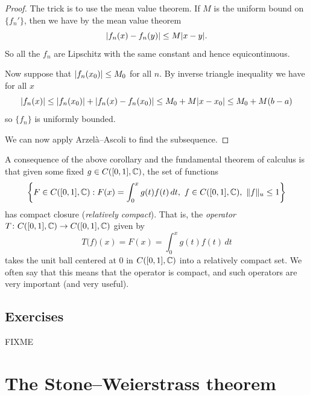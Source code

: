 \begin{proof}
The trick is to use the mean value theorem.  If $M$ is the uniform bound on
$\{ f_n' \}$, then we have by the mean value theorem
\begin{equation*}
\lvert {f_n(x)-f_n(y)} \rvert \leq M \lvert {x-y} \rvert .
\end{equation*}
So all the $f_n$ are Lipschitz with the same constant and hence
equicontinuous.

Now suppose that $\lvert {f_n(x_0)} \rvert \leq M_0$ for all $n$.
By inverse triangle inequality we have for all $x$
\begin{equation*}
\lvert {f_n(x)} \rvert \leq \lvert {f_n(x_0)} \rvert+ \lvert {f_n(x)-f_n(x_0)} \rvert \leq M_0+ M \lvert {x-x_0} \rvert
\leq M_0 + M(b-a)
\end{equation*}
so $\{ f_n \}$ is uniformly bounded.

We can now apply Arzel\`a--Ascoli to find the subsequence.
\end{proof}

A consequence of the above corollary and the fundamental theorem of calculus
is that given some fixed $g \in
C([0,1],{\mathbb{C}})$,
the set of functions
\begin{equation*}
\left\{
F \in C([0,1],{\mathbb{C}}) : F(x) = \int_0^x g(t) f(t)\,dt,~ f \in C([0,1],{\mathbb{C}}),~
\lVert {f} \rVert_u \leq 1
\right\}
\end{equation*}
has compact closure (\emph{relatively compact}).
That is, the \emph{operator} $T \colon C([0,1],{\mathbb{C}}) \to C([0,1],{\mathbb{C}})$ given by
\begin{equation*}
T\bigl(f\bigr) (x) = F(x) = \int_0^x g(t) f(t)\,dt
\end{equation*}
takes the unit ball centered at 0 in $C([0,1],{\mathbb{C}})$ into a relatively compact set.  We often
say that this means that the operator is compact, and such operators are very
important (and very useful).

\subsection{Exercises}

FIXME


\sectionnewpage
\section{The Stone--Weierstrass theorem}
\label{sec:FIXME}


